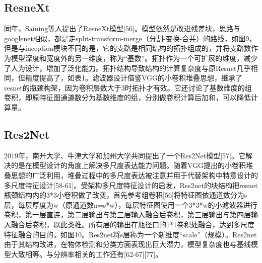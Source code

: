 \documentclass[15pt]{article}
\begin{document}
\subsection{ResneXt}
同年，Saining等人提出了ResneXt模型[56]。模型依然是改进残差块，思路与googlenet相似，都是走split-transform-merge（分割-变换-合并）的路线，如图9，但是与inception模块不同的是，它的支路是相同结构的拓扑组成的，并将支路数作为模型深度和宽度外的另一维度，称为“基数”。拓扑作为一个可扩展的维度，减少了人为设计，增加了泛化能力。拓扑结构导致结构的计算复杂度与原Resnet几乎相同，但精度提高了，如表1。滤波器设计借鉴VGG的小卷积堆叠思想，继承了resnet的瓶颈构架，因为卷积层数大于3时拓扑才有效。它还讨论了基数维度的组卷积，即原特征图通道数分为基数维度的组，分别做卷积计算后加和，可以降低计算量。

\subsection{Res2Net}
2019年，南开大学、牛津大学和加州大学共同提出了一个Res2Net模型[57]。它解决的是在模型设计的角度上解决多尺度表达能力问题。随着VGG提出的小卷积堆叠思想的广泛利用，堆叠过程中的多尺度表达被注意并用于代替架构中特意设计的多尺度特征设计[58-61]。受架构多尺度特征设计的启发，Res2net的块结构把resnet瓶颈结构内的3*3小卷积做了改变，首先参考组卷积[56]将特征图依通道数分为s层，每层厚度为w（原通道数n=s*w），每层特征图使用一个3*3*w的小滤波器进行卷积，第一层直连，第二层输出与第三层输入融合后卷积，第三层输出与第四层输入融合后卷积，以此类推。所有层的输出在瓶径口的1*1卷积处融合，达到多尺度特征融合的目的，如图10。Res2net将s层称为一个新维度“scale”（规模）。Res2net由于其结构改进，在物体检测和分类方面表现出巨大潜力，模型复杂度也与基线模型大致相等。与分辨率相关的工作还有[62-67][77]。
\end{document}
